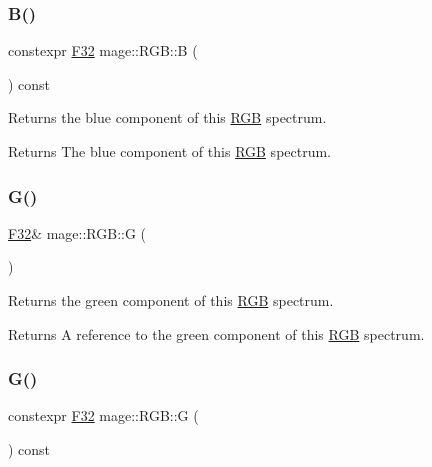 \subsubsection{\texorpdfstring{B()}{B()}\hspace{0.1cm}{\footnotesize\ttfamily [2/2]}}
{\footnotesize\ttfamily constexpr \mbox{\hyperlink{namespacemage_aa97e833b45f06d60a0a9c4fc22ae02c0}{F32}} mage\+::\+R\+G\+B\+::B (\begin{DoxyParamCaption}{ }\end{DoxyParamCaption}) const\hspace{0.3cm}{\ttfamily [noexcept]}}

Returns the blue component of this \mbox{\hyperlink{structmage_1_1_r_g_b}{R\+GB}} spectrum.

\begin{DoxyReturn}{Returns}
The blue component of this \mbox{\hyperlink{structmage_1_1_r_g_b}{R\+GB}} spectrum. 
\end{DoxyReturn}
\mbox{\label{structmage_1_1_r_g_b_aedeed66436cdee0e7a9f19e650d3a44b}} 
\subsubsection{\texorpdfstring{G()}{G()}\hspace{0.1cm}{\footnotesize\ttfamily [1/2]}}
{\footnotesize\ttfamily \mbox{\hyperlink{namespacemage_aa97e833b45f06d60a0a9c4fc22ae02c0}{F32}}\& mage\+::\+R\+G\+B\+::G (\begin{DoxyParamCaption}{ }\end{DoxyParamCaption})\hspace{0.3cm}{\ttfamily [noexcept]}}

Returns the green component of this \mbox{\hyperlink{structmage_1_1_r_g_b}{R\+GB}} spectrum.

\begin{DoxyReturn}{Returns}
A reference to the green component of this \mbox{\hyperlink{structmage_1_1_r_g_b}{R\+GB}} spectrum. 
\end{DoxyReturn}
\mbox{\label{structmage_1_1_r_g_b_a3cff21300a4b2f44692b39d09930af39}} 
\subsubsection{\texorpdfstring{G()}{G()}\hspace{0.1cm}{\footnotesize\ttfamily [2/2]}}
{\footnotesize\ttfamily constexpr \mbox{\hyperlink{namespacemage_aa97e833b45f06d60a0a9c4fc22ae02c0}{F32}} mage\+::\+R\+G\+B\+::G (\begin{DoxyParamCaption}{ }\end{DoxyParamCaption}) const\hspace{0.3cm}{\ttfamily [noexcept]}}

